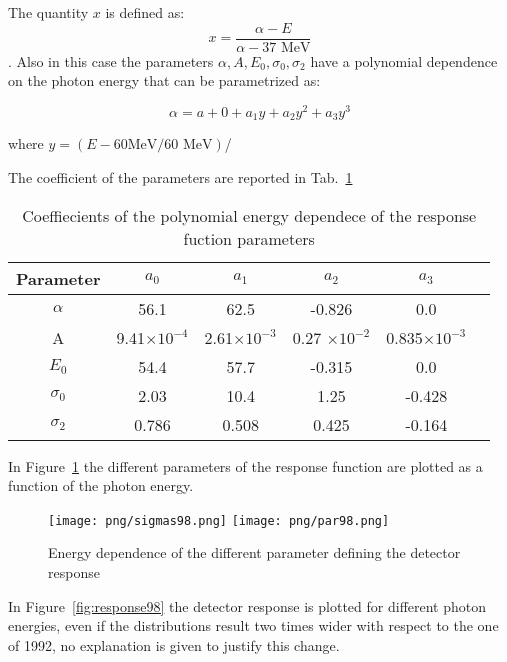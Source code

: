 The quantity $x$ is defined as: 
$$x= \frac{\alpha- E}{\alpha -37 \text{ MeV}}$$.
Also in this case the parameters $\alpha,A,E_0,\sigma_0,\sigma_2$ have a polynomial dependence on the photon energy that can be parametrized as:

\begin{equation}
\alpha= a+0+a_1y+a_2y^2+a_3y^3
\end{equation}

where $y= (E-60 \text{MeV}/60 \text{ MeV})$/


The  coefficient of the parameters are reported in Tab.~\ref{tab:param98}
\begin{table}[!h]
\begin{center}
\begin{tabular}{| c | c | c | c | c | c | }
\hline
Parameter & $a_0$ & $a_1$ & $a_2$ & $a_3$ \\ \hline
$\alpha$ & 56.1 &62.5 & -0.826 & 0.0  \\ \hline
A & 9.41$\times 10^{-4}$ & 2.61$\times 10^{-3}$ &0.27 $\times 10^{-2}$ &0.835$\times 10^{-3}$   \\ \hline
$E_0$ & 54.4 & 57.7 & -0.315 &0.0 \\ \hline
$\sigma_0$ & 2.03 &10.4 &1.25 & -0.428\\ \hline
$\sigma_2$ & 0.786 & 0.508 & 0.425 & -0.164\\ \hline

\end{tabular}
\end{center}
\caption{Coeffiecients of the polynomial energy dependece of the response fuction parameters\label{tab:param98}}
\end{table}

In Figure~\ref{fig:parameters98} the different parameters of the response function are plotted as a function of the photon energy.


\begin{figure}[!h]
 \begin{center}
 \texttt{[image: png/sigmas98.png]} 
 \texttt{[image: png/par98.png]} 
 \end{center}
 \caption{Energy dependence of the different parameter defining the detector response}
 \label{fig:parameters98}
 \end{figure}

In  Figure~\ref{fig:response98} the detector response is plotted for different photon energies, even if the distributions result two times wider with respect to the one of 1992, no explanation is given to justify this change. 

